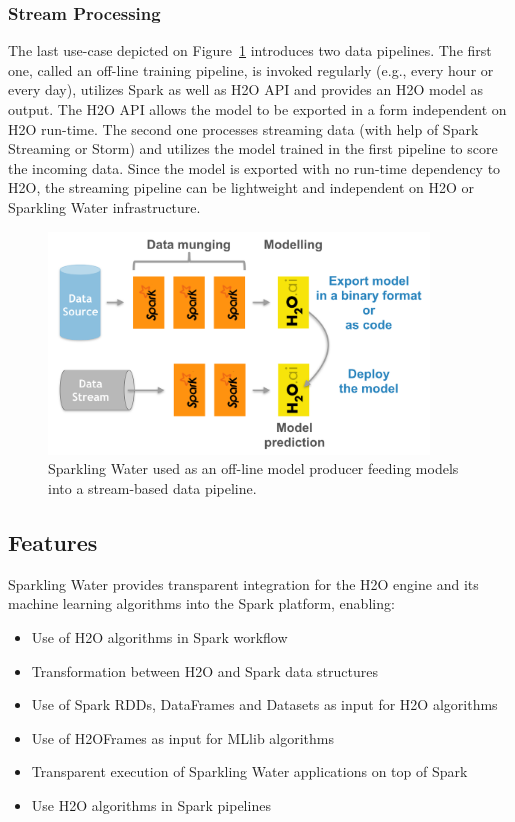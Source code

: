 \documentclass{standalone}
\begin{document}
\subsubsection{Stream Processing}
The last use-case depicted on Figure~\ref{fig:uc3} introduces two data pipelines. The first one, called an off-line training pipeline, is invoked regularly (e.g., every hour or every day), utilizes Spark as well as H2O API and provides an H2O model as output. The H2O API allows the model to be exported in a form independent on H2O run-time. The second one processes streaming data (with help of Spark Streaming or Storm) and utilizes the model trained in the first pipeline to score the incoming data. Since the model is exported with no run-time dependency to H2O, the streaming pipeline can be lightweight and independent on H2O or Sparkling Water infrastructure.

\begin{figure}[h]
	\centering
	\includegraphics[width=0.9\textwidth]{sw/images/uc3.png}
	\caption{Sparkling Water used as an off-line model producer feeding models into a stream-based data pipeline.}
	\label{fig:uc3} 
\end{figure}

\subsection{Features}

Sparkling Water provides transparent integration for the H2O engine and its machine learning algorithms into the Spark platform, enabling:

\begin{itemize}

 \item Use of H2O algorithms in Spark workflow
 \item Transformation between H2O and Spark data structures
 \item Use of Spark RDDs, DataFrames and Datasets as input for H2O algorithms
 \item Use of H2OFrames as input for MLlib algorithms
 \item Transparent execution of Sparkling Water applications on top of Spark
 \item Use H2O algorithms in Spark pipelines
\end{itemize}
\end{document}
